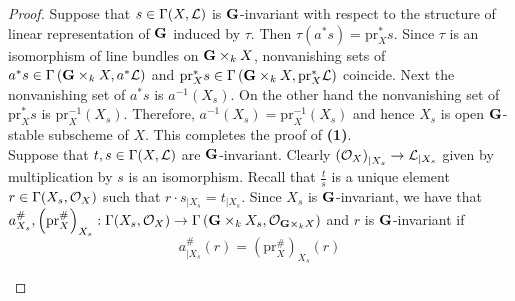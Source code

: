 \begin{proof}
Suppose that $s\in \Gamma(X,{\mathcal L})$ is $\mathbf{G}$-invariant with respect to the structure of linear representation of $\mathbf{G}$ induced by $\tau$. Then $\tau(a^*s) = \mathrm{pr}_X^*s$. Since $\tau$ is an isomorphism of line bundles on $\mathbf{G}\times_kX$, nonvanishing sets of $a^*s \in \Gamma\left(\mathbf{G}\times_kX,a^*{\mathcal L}\right)$ and $\mathrm{pr}_X^*s \in \Gamma\left(\mathbf{G}\times_kX,\mathrm{pr}_X^*{\mathcal L}\right)$ coincide. Next the nonvanishing set of $a^*s$ is $a^{-1}(X_s)$. On the other hand the nonvanishing set of $\mathrm{pr}_X^*s$ is $\mathrm{pr}_X^{-1}(X_s)$. Therefore, $a^{-1}(X_s) = \mathrm{pr}_X^{-1}(X_s)$ and hence $X_s$ is open $\mathbf{G}$-stable subscheme of $X$. This completes the proof of \textbf{(1)}.\\
Suppose that $t,s\in \Gamma(X,{\mathcal L})$ are $\mathbf{G}$-invariant. Clearly $\left({\mathcal O}_{X}\right)_{\mid X_s} \rightarrow {\mathcal L}_{\mid X_s}$ given by multiplication by $s$ is an isomorphism. Recall that $\frac{t}{s}$ is a unique element $r \in \Gamma(X_s,{\mathcal O}_X)$ such that $r\cdot s_{\mid X_s} = t_{\mid X_s}$. Since $X_s$ is $\mathbf{G}$-invariant, we have that $a^{\#}_{X_s},\left(\mathrm{pr}_X^{\#}\right)_{X_s}:\Gamma(X_s,{\mathcal O}_X)\rightarrow \Gamma\left(\mathbf{G}\times_kX_s,{\mathcal O}_{\mathbf{G}\times_kX} \right)$ and $r$ is $\mathbf{G}$-invariant if 
$$a^{\#}_{\mid X_s}(r) = \left(\mathrm{pr}^{\#}_X\right)_{X_s}(r)$$
\begin{center}
\end{center}


\end{proof}







\small



    

